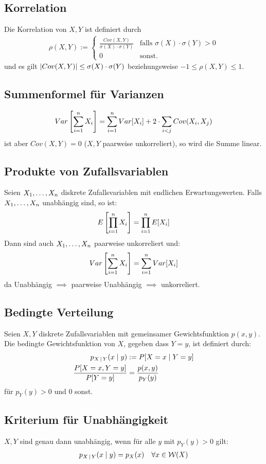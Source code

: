 \subsection{Korrelation}
Die Korrelation von $X, Y$ ist definiert durch
\begin{align*}
  \rho (X, Y) := \begin{cases}
                   \frac{Cov (X, Y)}{\sigma (X) \cdot \sigma (Y)} & \text{falls } \sigma (X) \cdot \sigma (Y) > 0 \\
                   0                                              & \text{sonst.}
                 \end{cases}
\end{align*}
und es gilt $\abs{Cov (X, Y)} \leq \sigma (X) \cdot \sigma (Y)$
beziehungsweise $-1 \leq \rho (X, Y) \leq 1$.
\subsection{Summenformel für Varianzen}
\begin{align*}
  Var \left[ \sum_{i = 1}^n X_i \right] = \sum_{i = 1}^n Var[X_i] + 2 \cdot \sum_{i < j} Cov (X_i, X_j)
\end{align*}
ist aber $Cov (X, Y) = 0$  ($X, Y$ paarweise unkorreliert), so wird
die Summe linear.
\subsection{Produkte von Zufallsvariablen}
Seien $X_1, \dots, X_n$ diskrete Zufallsvariablen mit endlichen
Erwartungswerten. Falls $X_1, \dots, X_n$ unabhängig sind, so ist:
\begin{align*}
  E \left[ \prod_{i = 1}^n X_i \right] = \prod_{i = 1}^n E[X_i]
\end{align*}
Dann sind auch $X_1, \dots, X_n$ paarweise unkorreliert und:
\begin{align*}
  Var \left[ \sum_{i = 1}^n X_i \right] = \sum_{i = 1}^n Var[X_i]
\end{align*}
da Unabhängig $\implies$ paarweise Unabhängig $\implies$ unkorreliert.
\subsection{Bedingte Verteilung}
Seien $X, Y$ diskrete Zufallsvariablen mit gemeinsamer Gewichtsfunktion $p (x,
  y)$. Die bedingte Gewichtsfunktion von $X$, gegeben dass $Y = y$, ist definiert
durch:
\begin{align*}
  p_{X \, | \, Y} (x \; | \; y)    & := P[X = x \; | \; Y = y]     \\
  \frac{P[X = x, Y = y]}{P[Y = y]} & = \frac{p (x, y)}{p_Y (y)} \\
\end{align*}
für $p_Y (y) > 0$ und $0$ sonst.
\subsection{Kriterium für Unabhängigkeit}
$X, Y$ sind genau dann unabhängig, wenn für alle $y$ mit $p_Y (y) > 0$
gilt:
\begin{align*}
  p_{X\,|\,Y} (x \; | \; y) = p_X (x) &  & \forall x \in \mathcal{W} (X)
\end{align*}

